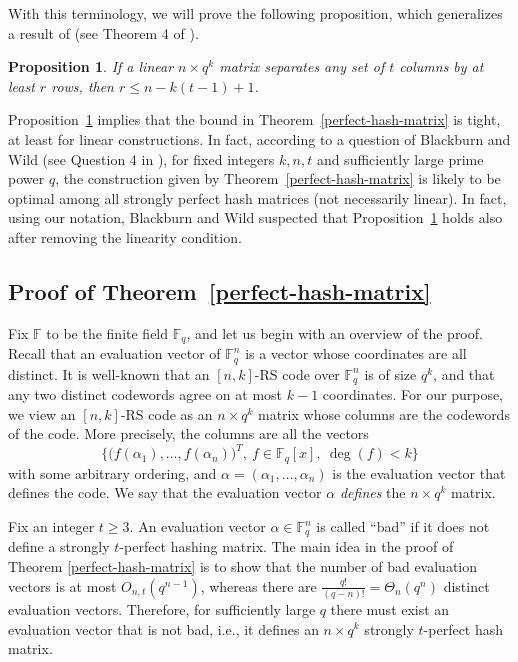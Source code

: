 \documentclass[11pt]{article}
\newtheorem{proposition}[theorem]{Proposition}
\newcommand\black[1]{{\color{black} #1}}
\begin{document}
With this terminology, we will prove the following proposition, which generalizes a result of \cite{Blackburn1998Optimal} (see Theorem 4 of \cite{Blackburn1998Optimal}).
\begin{proposition}\label{proposition}
  If a linear $n\times q^k$ matrix  separates any  set of $t$ columns by at least $r$ rows, then $r\leq n-k(t-1)+1$.
\end{proposition}
Proposition~\ref{proposition} implies that the bound in Theorem~\ref{perfect-hash-matrix} is tight, at least for linear constructions. \black{In fact, according to a question of Blackburn and Wild (see Question 4 in \cite{Blackburn1998Optimal}), for fixed integers $k,n,t$ and sufficiently large prime power $q$, the construction given by Theorem~\ref{perfect-hash-matrix} is likely to be optimal among all strongly perfect hash matrices (not necessarily linear). In fact, using our notation, Blackburn and Wild suspected that Proposition~\ref{proposition} holds also after removing the linearity condition.}


\subsection{Proof of Theorem~\ref{perfect-hash-matrix}}
Fix $\mathbb{F}$ to be the finite field $\mathbb{F}_q$, and let us begin with an overview of the proof.
Recall that an evaluation vector  of $\mathbb{F}_q^n$ is a vector whose coordinates are all distinct.
It is well-known that an $[n,k]$-RS code over  $\mathbb{F}_q^n$  is of size $q^k$, and that  any two distinct codewords agree on at most  $k-1$  coordinates. For our purpose, we view an $[n,k]$-RS code as an $n\times q^k$ matrix whose  columns are the codewords of the code. More precisely, the columns are all  the vectors $$\big\{\big(f(\alpha_1),\ldots,f(\alpha_n)\big)^T,~f\in\mathbb{F}_q[x],~\deg(f)< k\big\}$$ with some arbitrary ordering, and   $\alpha=(\alpha_1,\ldots,\alpha_n)$ is the evaluation vector that defines the code. We say that the evaluation vector $\alpha$ {\it defines} the  $n\times q^k$ matrix.

Fix an integer $t\ge 3$. An evaluation vector $\alpha\in\mathbb{F}_q^n$ is called ``bad'' if it does not define a strongly $t$-perfect hashing matrix.
The main idea in the proof of Theorem \ref{perfect-hash-matrix} is to show that the number of bad evaluation vectors is at most $O_{n,t}(q^{n-1})$, whereas   there are $\frac{q!}{(q-n)!}=\Theta_n(q^n)$ distinct evaluation vectors. Therefore,  for sufficiently large $q$ there must exist an evaluation vector that is not bad, i.e., it defines an $n\times q^k$ strongly $t$-perfect hash matrix.
\end{document}
